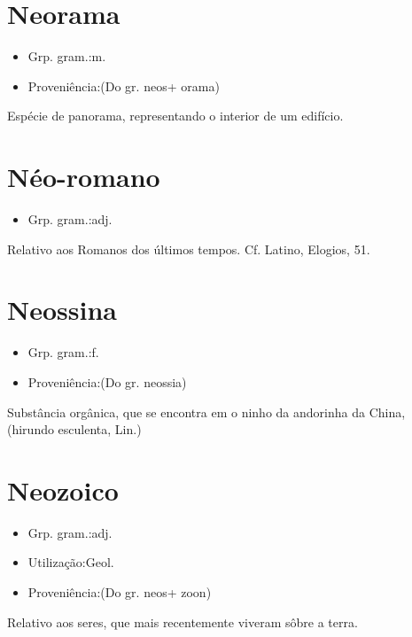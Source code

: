 \section{Neorama}
\begin{itemize}
\item {Grp. gram.:m.}
\end{itemize}
\begin{itemize}
\item {Proveniência:(Do gr. \textunderscore neos\textunderscore  + \textunderscore orama\textunderscore )}
\end{itemize}
Espécie de panorama, representando o interior de um edifício.
\section{Néo-romano}
\begin{itemize}
\item {Grp. gram.:adj.}
\end{itemize}
Relativo aos Romanos dos últimos tempos. Cf. Latino, \textunderscore Elogios\textunderscore , 51.
\section{Neossina}
\begin{itemize}
\item {Grp. gram.:f.}
\end{itemize}
\begin{itemize}
\item {Proveniência:(Do gr. \textunderscore neossia\textunderscore )}
\end{itemize}
Substância orgânica, que se encontra em o ninho da andorinha da China, (\textunderscore hirundo esculenta\textunderscore , Lin.)
\section{Neozoico}
\begin{itemize}
\item {Grp. gram.:adj.}
\end{itemize}
\begin{itemize}
\item {Utilização:Geol.}
\end{itemize}
\begin{itemize}
\item {Proveniência:(Do gr. \textunderscore neos\textunderscore  + \textunderscore zoon\textunderscore )}
\end{itemize}
Relativo aos seres, que mais recentemente viveram sôbre a terra.
